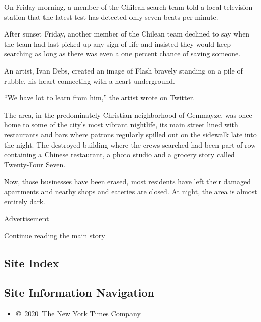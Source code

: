 On Friday morning, a member of the Chilean search team told a local
television station that the latest test has detected only seven beats
per minute.

After sunset Friday, another member of the Chilean team declined to say
when the team had last picked up any sign of life and insisted they
would keep searching as long as there was even a one percent chance of
saving someone.

An artist, Ivan Debs, created an image of Flash bravely standing on a
pile of rubble, his heart connecting with a heart underground.

``We have lot to learn from him,'' the artist wrote on Twitter.

The area, in the predominately Christian neighborhood of Gemmayze, was
once home to some of the city's most vibrant nightlife, its main street
lined with restaurants and bars where patrons regularly spilled out on
the sidewalk late into the night. The destroyed building where the crews
searched had been part of row containing a Chinese restaurant, a photo
studio and a grocery story called Twenty-Four Seven.

Now, those businesses have been erased, most residents have left their
damaged apartments and nearby shops and eateries are closed. At night,
the area is almost entirely dark.

Advertisement

\protect\hyperlink{after-bottom}{Continue reading the main story}

\hypertarget{site-index}{%
\subsection{Site Index}\label{site-index}}

\hypertarget{site-information-navigation}{%
\subsection{Site Information
Navigation}\label{site-information-navigation}}

\begin{itemize}
\tightlist
\item
  \href{https://help.nytimes3xbfgragh.onion/hc/en-us/articles/115014792127-Copyright-notice}{©~2020~The
  New York Times Company}
\end{itemize}


